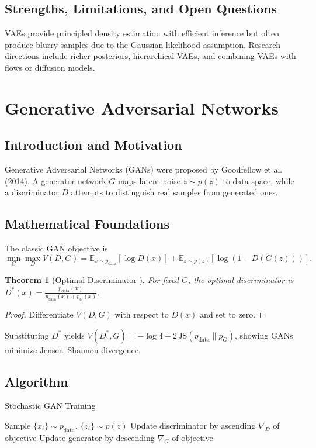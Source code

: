 \documentclass[11pt]{book}
\newtheorem{theorem}{Theorem}[chapter]
\begin{document}
\subsection{Strengths, Limitations, and Open Questions}
VAEs provide principled density estimation with efficient inference but often produce blurry samples due to the Gaussian likelihood assumption. Research directions include richer posteriors, hierarchical VAEs, and combining VAEs with flows or diffusion models.

\section{Generative Adversarial Networks}
\subsection{Introduction and Motivation}
Generative Adversarial Networks (GANs) were proposed by Goodfellow et al. (2014). A generator network $G$ maps latent noise $z\sim p(z)$ to data space, while a discriminator $D$ attempts to distinguish real samples from generated ones.

\subsection{Mathematical Foundations}
The classic GAN objective is
\begin{equation}
\min_G \max_D V(D,G) = \mathbb{E}_{x\sim p_{\text{data}}} [\log D(x)] + \mathbb{E}_{z\sim p(z)} [\log(1-D(G(z)))].
\end{equation}

\begin{theorem}[Optimal Discriminator \cite{goodfellow2014}]
For fixed $G$, the optimal discriminator is $D^*(x)=\frac{p_{\text{data}}(x)}{p_{\text{data}}(x)+p_G(x)}$.
\end{theorem}
\begin{proof}
Differentiate $V(D,G)$ with respect to $D(x)$ and set to zero.
\end{proof}
Substituting $D^*$ yields $V(D^*,G)= -\log 4 + 2\,\text{JS}(p_{\text{data}}\|p_G)$, showing GANs minimize Jensen--Shannon divergence.

\subsection{Algorithm}
\begin{algorithm}
\caption{Stochastic GAN Training}
\begin{algorithmic}[1]
    \STATE Sample $\{x_i\}\sim p_{\text{data}}$, $\{z_i\}\sim p(z)$
    \STATE Update discriminator by ascending $\nabla_D$ of objective
    \STATE Update generator by descending $\nabla_G$ of objective
\ENDFOR
\end{algorithmic}
\end{algorithm}
\end{document}
